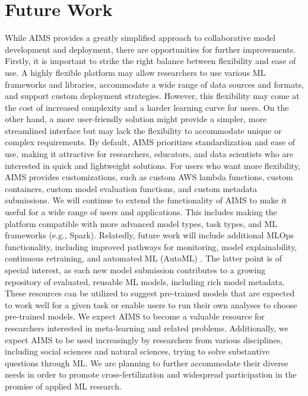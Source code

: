 \section{Future Work}
While AIMS provides a greatly simplified approach to collaborative model development and deployment, there are opportunities for further improvements. Firstly, it is important to strike the right balance between flexibility and ease of use. A highly flexible platform may allow researchers to use various ML frameworks and libraries, accommodate a wide range of data sources and formats, and support custom deployment strategies. However, this flexibility may come at the cost of increased complexity and a harder learning curve for users. On the other hand, a more user-friendly solution might provide a simpler, more streamlined interface but may lack the flexibility to accommodate unique or complex requirements. By default, AIMS prioritizes standardization and ease of use, making it attractive for researchers, educators, and data scientists who are interested in quick and lightweight solutions. For users who want more flexibility, AIMS provides customizations, such as custom AWS lambda functions, custom containers, custom model evaluation functions, and custom metadata submissions. We will continue to extend the functionality of AIMS to make it useful for a wide range of users and applications. This includes making the platform compatible with more advanced model types, task types, and ML frameworks (e.g., Spark). Relatedly, future work will include additional MLOps functionality, including improved pathways for monitoring, model explainability, continuous retraining, and automated ML (AutoML) \citep{hutter_automated_2019, he_automl_2021}. The latter point is of special interest, as each new model submission contributes to a growing repository of evaluated, reusable ML models, including rich model metadata. These resources can be utilized to suggest pre-trained models that are expected to work well for a given task or enable users to run their own analyses to choose pre-trained models. We expect AIMS to become a valuable resource for researchers interested in meta-learning \citep{hospedales_meta-learning_2020, finn_model-agnostic_2017} and related problems. Additionally, we expect AIMS to be used increasingly by researchers from various disciplines, including social sciences and natural sciences, trying to solve substantive questions through ML. We are planning to further accommodate their diverse needs in order to promote cross-fertilization and widespread participation in the promise of applied ML research. 


